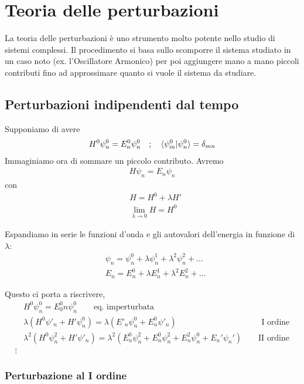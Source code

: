 \chapter{Teoria delle perturbazioni}

La teoria delle perturbazioni è uno strumento molto potente nello studio di sistemi complessi. Il procedimento si basa sullo scomporre il sistema studiato in un caso noto (ex. l'Oscillatore Armonico) per poi aggiungere mano a mano piccoli contributi fino ad approssimare quanto si vuole il sistema da studiare.

\section{Perturbazioni indipendenti dal tempo}

Supponiamo di avere
\begin{align}
H^0\psi_n^0=E_n^0\psi_n^0 \quad ; \quad \braket{\psi_m^0|\psi_n^0}=\delta_{mn}
\end{align}
Immaginiamo ora di sommare un piccolo contributo. Avremo
\begin{align}
H\psi_n=E_n\psi_n 
\end{align}
con
\begin{align}
{}&H= H^0 + \lambda H'\\
&\lim_{\lambda \rightarrow 0}H= H^0
\end{align}

Espandiamo in serie le funzioni d'onda e gli autovalori dell'energia in funzione di $\lambda$:
\begin{align}
{}&\psi_n= \psi^0_n + \lambda \psi_n^1+ \lambda^2 \psi_n^2+\dots \\
&E_n= E_n^0 + \lambda E_n^1+ \lambda^2 E_n^2+\dots
\end{align}

Questo ci porta a riscrivere, 
\begin{align}
{}&H^0\psi^0_n=E^0_0n\psi^0_n	\qquad \text{eq. imperturbata}\\
&\lambda(H^0\psi'_n + H'\psi^0_n)=\lambda(E'_n \psi^0_n + E^0_n\psi'_n) \qquad\qquad\qquad\qquad\qquad\,\, \text{I ordine}\\
&\lambda^2 (H^0\psi^2_n + H'\psi'_n)=\lambda^2 (E^0_n \psi^2_n + E^0_n \psi_n^2 + E_n^2\psi_n^0 + E_n'\psi_n')\qquad \text{II ordine} \\
\vdots \nonumber
\end{align}
\newpage
\subsection{Perturbazione al I ordine}

